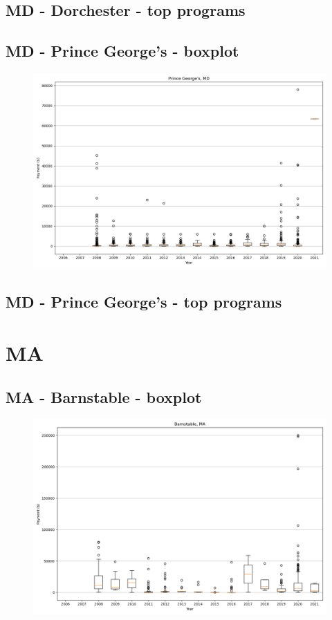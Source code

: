 \subsection*{MD - Dorchester - top programs}

\newpage
\subsection*{MD - Prince George's - boxplot}
\begin{figure}[h]
\centering
\includegraphics[width=7in]{../output/boxplots/counties/Prince George's-MD_boxplot.png}
\end{figure}


\subsection*{MD - Prince George's - top programs}

\newpage
\section*{MA}
\subsection*{MA - Barnstable - boxplot}
\begin{figure}[h]
\centering
\includegraphics[width=7in]{../output/boxplots/counties/Barnstable-MA_boxplot.png}
\end{figure}


